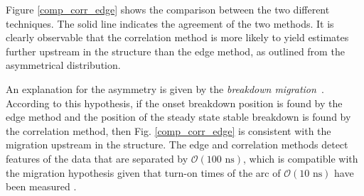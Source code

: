Figure \ref{comp_corr_edge} shows the comparison between the two different techniques. The solid line indicates the agreement of the two methods. It is clearly observable that the correlation method is more likely to yield estimates further upstream in the structure than the edge method, as outlined from the asymmetrical distribution. 

An explanation for the asymmetry is given by the \textit{breakdown migration}~\cite{Woolley:2015,Jacewicz:CLICWS16,Degiovanni:migration}. According to this hypothesis, if the onset breakdown position is found by the edge method and the position of the steady state stable breakdown is found by the correlation method, then Fig. \ref{comp_corr_edge} is consistent with the migration upstream in the structure. The edge and correlation methods detect features of the data that are separated by $\mathcal{O}(100 \text{ ns})$, which is compatible with the migration hypothesis given that turn-on times of the arc of $\mathcal{O}(10 \text{ ns})$ have been measured \cite{Shipman:1999457,Shipman:1459884}.



